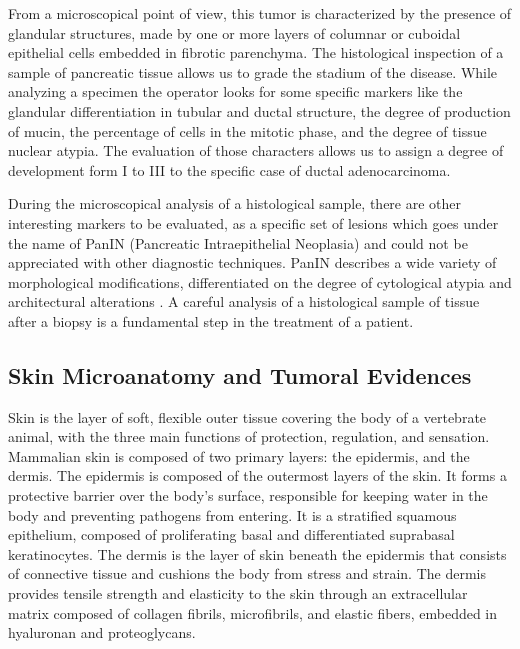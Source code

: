     From a microscopical point of view, this tumor is characterized by the presence of glandular structures, made by one or more layers of columnar or cuboidal epithelial cells embedded in fibrotic parenchyma. The histological inspection of a sample of pancreatic tissue allows us to grade the stadium of the disease. While analyzing a specimen the operator looks for some specific markers like the glandular differentiation in tubular and ductal structure, the degree of production of mucin, the percentage of cells in the mitotic phase, and the degree of tissue nuclear atypia. The evaluation of those characters allows us to assign a degree of development form I to III to the specific case of ductal adenocarcinoma.

    During the microscopical analysis of a histological sample, there are other interesting markers to be evaluated, as a specific set of lesions which goes under the name of PanIN (Pancreatic Intraepithelial Neoplasia) and could not be appreciated with other diagnostic techniques. PanIN describes a wide variety of morphological modifications, differentiated on the degree of cytological atypia and architectural alterations \cite{pmid18787611}. A careful analysis of a histological sample of tissue after a biopsy is a fundamental step in the treatment of a patient.

\subsection{Skin Microanatomy and Tumoral Evidences} \label{ssec:derm_anat}
    Skin is the layer of soft, flexible outer tissue covering the body of a vertebrate animal, with the three main functions of protection, regulation, and sensation. Mammalian skin is composed of two primary layers: the epidermis, and the dermis.
    The epidermis is composed of the outermost layers of the skin. It forms a protective barrier over the body's surface, responsible for keeping water in the body and preventing pathogens from entering. It is a stratified squamous epithelium, composed of proliferating basal and differentiated suprabasal keratinocytes. The dermis is the layer of skin beneath the epidermis that consists of connective tissue and cushions the body from stress and strain. The dermis provides tensile strength and elasticity to the skin through an extracellular matrix composed of collagen fibrils, microfibrils, and elastic fibers, embedded in hyaluronan and proteoglycans.

